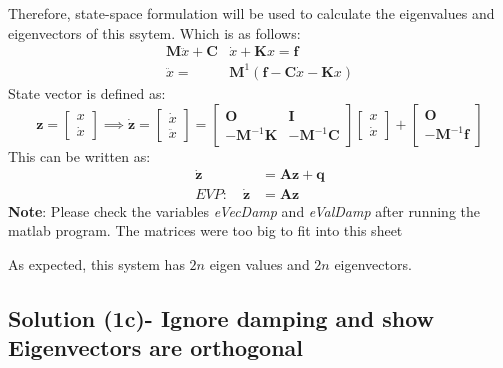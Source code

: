 \documentclass[11pt, oneside]{article}   	%
\begin{document}
Therefore, state-space formulation will be used to calculate the eigenvalues and eigenvectors of this ssytem. Which is as follows:
\begin{align}
\boldsymbol{M}\ddot{x} + \boldsymbol{C} &\dot{x} + \boldsymbol{K} x = \boldsymbol{f} \\
\ddot{x} = &\boldsymbol{M}^{1} (\boldsymbol{f}- \boldsymbol{C} \dot{x} - \boldsymbol{K} x)
\end{align}
State vector is defined as:
\[ \textbf{z} = \begin{bmatrix}
x \\
\dot{x}
\end{bmatrix} \implies \boldsymbol{\dot{z}} = \begin{bmatrix}
\dot{x} \\
\ddot{x}
\end{bmatrix} = \begin{bmatrix}
\textbf{O} & \textbf{I} \\
-\textbf{M}^{-1} \textbf{K} & -\textbf{M}^{-1} \textbf{C}
\end{bmatrix} \begin{bmatrix}
x \\
\dot{x}
\end{bmatrix} + \begin{bmatrix}
\textbf{O} \\
-\textbf{M}^{-1} \textbf{f}
\end{bmatrix}
\]
This can be written as: 
\begin{align}
\boldsymbol{\dot{z}} &= \boldsymbol{A} \boldsymbol{z} + \boldsymbol{q} \\
EVP: \quad \boldsymbol{\dot{z}} &= \boldsymbol{A} \boldsymbol{z}
\end{align}
\noindent
\textbf{Note}: Please check the variables \textit{eVecDamp} and \textit{eValDamp} after running the matlab program. The matrices were too big to fit into this sheet

As expected, this system has $2n$ eigen values and $2n$ eigenvectors. 

\subsection{Solution (1c)- Ignore damping and show Eigenvectors are orthogonal}
\end{document}
